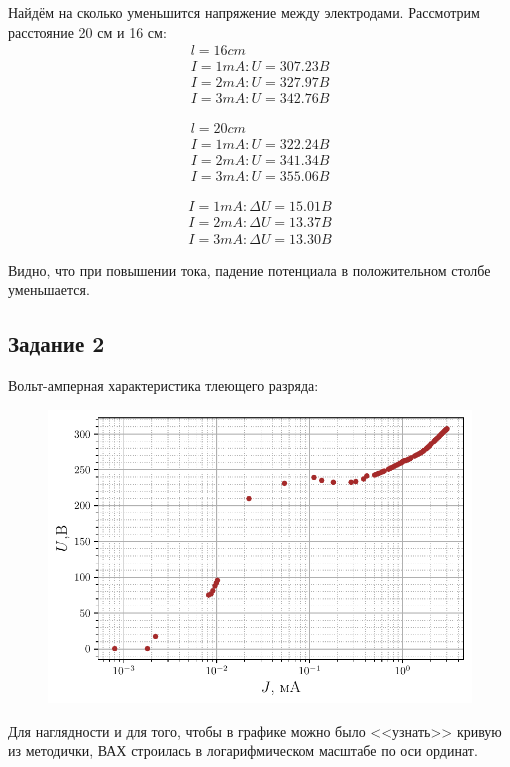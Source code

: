 Найдём на сколько уменьшится напряжение между электродами. Рассмотрим 
расстояние 20 см и 16 см:
\begin{gather*}
	l = 16 cm \\
	I = 1 mA: U = 307.23 B \\
	I = 2 mA: U = 327.97 B \\
	I = 3 mA: U = 342.76 B
\end{gather*}

\begin{gather*}
	l = 20 cm \\
	I = 1 mA: U = 322.24 B \\
	I = 2 mA: U = 341.34 B \\
	I = 3 mA: U = 355.06 B
\end{gather*}

\begin{gather*}
	I = 1 mA: \Delta U = 15.01 B \\
	I = 2 mA: \Delta U = 13.37 B \\
	I = 3 mA: \Delta U = 13.30 B
\end{gather*}

Видно, что при повышении тока, падение потенциала в положительном 
столбе уменьшается.

\subsection{Задание 2}
Вольт-амперная характеристика тлеющего разряда:
\begin{figure}[H]
	\centering
    \includegraphics[width=0.75\linewidth]{scripts/fig2}
	\caption{}
	\label{fig:6}
\end{figure}

Для наглядности и для того, чтобы в графике можно было <<узнать>> кривую из 
методички, 
ВАХ строилась в логарифмическом масштабе по оси ординат.



